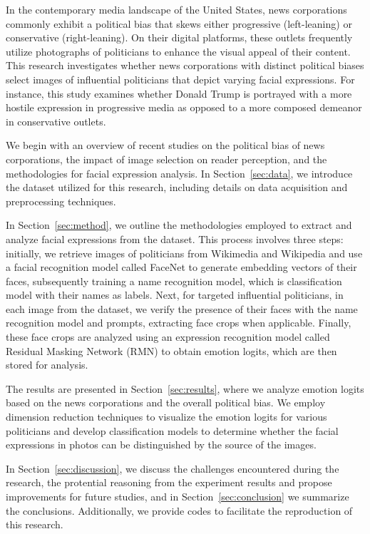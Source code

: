 \documentclass[sigconf]{acmart}
\begin{document}
In the contemporary media landscape of the United States, news corporations commonly exhibit a political bias that skews either progressive (left-leaning) or conservative (right-leaning). On their digital platforms, these outlets frequently utilize photographs of politicians to enhance the visual appeal of their content. This research investigates whether news corporations with distinct political biases select images of influential politicians that depict varying facial expressions. For instance, this study examines whether Donald Trump is portrayed with a more hostile expression in progressive media as opposed to a more composed demeanor in conservative outlets.

We begin with an overview of recent studies on the political bias of news corporations, the impact of image selection on reader perception, and the methodologies for facial expression analysis. In Section~\ref{sec:data}, we introduce the dataset utilized for this research, including details on data acquisition and preprocessing techniques.

In Section~\ref{sec:method}, we outline the methodologies employed to extract and analyze facial expressions from the dataset. This process involves three steps: initially, we retrieve images of politicians from Wikimedia and Wikipedia and use a facial recognition model called FaceNet \cite{facenet} to generate embedding vectors of their faces, subsequently training a name recognition model, which is classification model with their names as labels. Next, for targeted influential politicians, in each image from the dataset, we verify the presence of their faces with the name recognition model and prompts, extracting face crops when applicable. Finally, these face crops are analyzed using an expression recognition model called Residual Masking Network (RMN)\cite{rmn} to obtain emotion logits, which are then stored for analysis.

The results are presented in Section~\ref{sec:results}, where we analyze emotion logits based on the news corporations and the overall political bias. We employ dimension reduction techniques to visualize the emotion logits for various politicians and develop classification models to determine whether the facial expressions in photos can be distinguished by the source of the images.

In Section~\ref{sec:discussion}, we discuss the challenges encountered during the research, the protential reasoning from the experiment results and propose improvements for future studies, and in Section~\ref{sec:conclusion} we summarize the conclusions. Additionally, we provide codes to facilitate the reproduction of this research.
\end{document}
